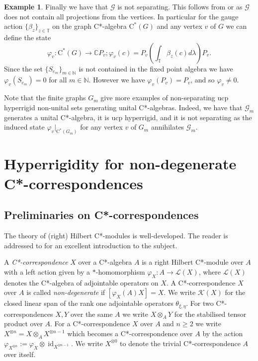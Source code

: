 \documentclass[11pt, draft]{amsart}
\numberwithin{equation}{section}
\theoremstyle{plain}
\theoremstyle{definition}
\newtheorem{example}[theorem]{Example}
\theoremstyle{remark}
\newcommand{\G}{{\mathcal{G}}}
\newcommand{\K}{{\mathcal{K}}}
\renewcommand{\L}{{\mathcal{L}}}
\def\be{\beta}
\def\la{\lambda}
\newcommand\vphi{\varphi}
\newcommand{\bC}{\mathbb{C}}
\newcommand{\bN}{\mathbb{N}}
\newcommand{\bT}{\mathbb{T}}
\newcommand{\ca}{\mathrm{C}^*}
\newcommand{\id}{{\operatorname{id}}}
\begin{document}
\begin{example}
Finally we have that $\G$ is not separating.
This follows from \cite[Theorem 5.1]{Sal17} or \cite[Remark 5.2]{Sal17} as $\G$ does not contain all projections from the vertices.
In particular for the gauge action $\{\be_z\}_{z \in \bT}$ on the graph C*-algebra $\ca(G)$ and any vertex $v$ of $G$ we can define the state
\[
\vphi_v \colon \ca(G) \to \bC P_v; \vphi_v(c) = P_v (\int_{\bT} \be_z(c) d\la) P_v.
\]
Since the set $\{S_{e_m}\}_{m \in \bN}$ is not contained in the fixed point algebra we have $\vphi_v(S_{e_m}) = 0$ for all $m \in \bN$.
However we have $\vphi_v(P_v) = P_v$, and so $\vphi_v \neq 0$.

Note that the finite graphs $G_m$ give more examples of non-separating ucp hyperrigid non-unital sets generating unital C*-algebras. Indeed, we have that $\G_m$ generates a unital C*-algebra, it is ucp hyperrigid, and it is not separating as the induced state ${\vphi_v}|_{\ca(G_m)}$ for any  vertex $v$ of $G_m$ annihilates $\G_m$.
\end{example}

\section{Hyperrigidity for non-degenerate C*-correspondences} \label{S:cor}

\subsection{Preliminaries on C*-correspondences}

The theory of (right) Hilbert C*-modules is well-developed.
The reader is addressed to \cite{Lan95,MT05} for an excellent introduction to the subject.

A \emph{C*-correspondence} $X$ over a C*-algebra $A$ is a right Hilbert C*-module over $A$ with a left action given by a $*$-homomorphism $\vphi_X \colon A \to \L(X)$, where $\L(X)$ denotes the C*-algebra of adjointable operators on $X$. A C*-correspondence $X$ over $A$ is called \emph{non-degenerate} if $[\vphi_X(A) X] = X$.
We write $\K(X)$ for the closed linear span of the rank one adjointable operators $\theta_{\xi, \eta}$.
For two C*-corresponden\-ces $X, Y$ over the same $A$ we write $X \otimes_A Y$ for the stabilised tensor product over $A$.
For a C*-correspondence $X$ over $A$ and $n \geq 2$ we write $X^{\otimes n} = X \otimes_A X^{\otimes n-1}$ which becomes a C*-correspondence over $A$ by the action $\vphi_{X^{\otimes n}} := \vphi_X \otimes \id_{X^{\otimes n-1}}$.
We write $X^{\otimes 0}$ to denote the trivial C*-correspondence $A$ over itself.
\end{document}
